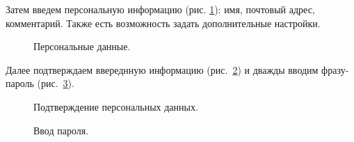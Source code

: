 \documentclass[10pt,a4paper,titlepage]{article}
\begin{document}
Затем введем персональную информацию \mbox(рис. {\ref{ris:image2}):} имя, почтовый адрес, комментарий. Также есть возможность задать дополнительные настройки.
\pagebreak
\begin{figure}[!h]	
\caption{Персональные данные.}
\label{ris:image2}
\end{figure}

Далее подтверждаем ввереднную информацию \mbox{(рис. \ref{ris:image3})} и дважды вводим фразу-пароль \mbox{(рис. \ref{ris:image4})}.

\begin{figure}[!h]	
\caption{Подтверждение персональных данных.}
\label{ris:image3}
\end{figure}

\begin{figure}[!h]	
\caption{Ввод пароля.}
\label{ris:image4}
\end{figure}
\end{document}
